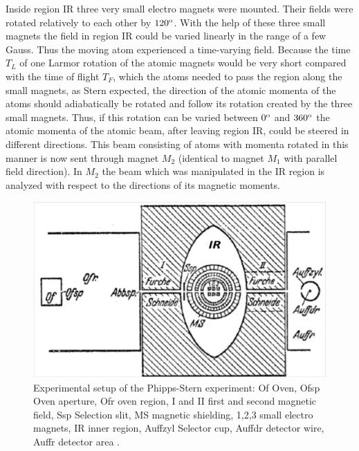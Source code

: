 \documentclass{article}
\begin{document}
Inside region IR three very small electro magnets were mounted. Their fields were rotated relatively to each other by $120^{\rm o}$. With the help of these three small magnets the field in region IR could be varied linearly in the range of a few Gauss. Thus the moving atom experienced a time-varying field. Because the time $T_L$ of one Larmor rotation of the atomic magnets would be very short compared with the time of flight $T_F$, which the atoms needed to pass the region along the small magnets, as Stern expected, the direction of the atomic momenta of the atoms should adiabatically be rotated and follow its rotation created by the three small magnets. Thus, if this rotation can be varied between $0^{\rm o}$ and $360^{\rm o}$ the atomic momenta of the atomic beam, after leaving region IR, could be steered in different directions. This beam consisting of atoms with momenta rotated in this manner is now sent through magnet $M_2$ (identical to magnet $M_1$ with parallel field direction). In $M_2$ the beam which was manipulated in the IR region is analyzed with respect to the directions of its magnetic moments. 
%
\begin{figure}
\begin{center}
\includegraphics[scale=0.4]{figures/PhippsSternSetup}
\caption{Experimental setup of the Phipps-Stern experiment: Of Oven, Ofsp Oven aperture, Ofr oven region, I and II first and second magnetic field, Ssp Selection slit, MS magnetic shielding, 1,2,3 small electro magnets, IR inner region, Auffzyl Selector cup, Auffdr detector wire, Auffr detector area \cite[p.~189]{PhippsTEtal1932Einstellung}.}
\label{fig:PhippsSternSetup}
\end{center}
\end{figure}
\end{document}
